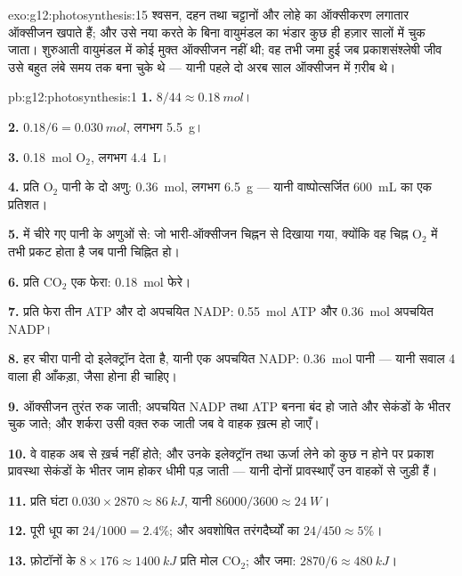 \begin{solution}{exo:g12:photosynthesis:15}
श्वसन, दहन तथा चट्टानों और लोहे का ऑक्सीकरण लगातार ऑक्सीजन खपाते हैं; और
उसे नया करते  के बिना वायुमंडल का भंडार कुछ ही हज़ार सालों में
चुक जाता। शुरुआती वायुमंडल में कोई मुक्त ऑक्सीजन नहीं थी; वह तभी जमा हुई जब
प्रकाशसंश्लेषी जीव उसे बहुत लंबे समय तक बना चुके थे --- यानी पहले दो अरब
साल ऑक्सीजन में ग़रीब थे।
\end{solution}

\begin{solution}{pb:g12:photosynthesis:1}
\textbf{1.} $8/44 \approx \qty{0.18}{mol}$।

\textbf{2.} $0.18/6 = \qty{0.030}{mol}$, लगभग \qty{5.5}{g}।

\textbf{3.} \qty{0.18}{mol} $\mathrm{O_2}$, लगभग \qty{4.4}{L}।

\textbf{4.} प्रति $\mathrm{O_2}$ पानी के दो अणु: \qty{0.36}{mol},
लगभग \qty{6.5}{g} --- यानी वाष्पोत्सर्जित \qty{600}{mL} का एक प्रतिशत।

\textbf{5.}  में चीरे गए पानी के अणुओं से: जो भारी-ऑक्सीजन
चिह्नन से दिखाया गया, क्योंकि वह चिह्न $\mathrm{O_2}$ में तभी प्रकट होता है
जब पानी चिह्नित हो।

\textbf{6.} प्रति $\mathrm{CO_2}$ एक फेरा: \qty{0.18}{mol} फेरे।

\textbf{7.} प्रति फेरा तीन ATP और दो अपचयित NADP: \qty{0.55}{mol}
ATP और \qty{0.36}{mol} अपचयित NADP।

\textbf{8.} हर चीरा पानी दो इलेक्ट्रॉन देता है, यानी एक अपचयित NADP:
\qty{0.36}{mol} पानी --- यानी सवाल 4 वाला ही आँकड़ा, जैसा होना ही
चाहिए।

\textbf{9.} ऑक्सीजन तुरंत रुक जाती; अपचयित NADP तथा ATP बनना बंद हो जाते और
सेकंडों के भीतर चुक जाते; और शर्करा उसी वक़्त रुक जाती जब वे वाहक ख़त्म हो
जाएँ।

\textbf{10.} वे वाहक अब  से ख़र्च नहीं होते; और उनके इलेक्ट्रॉन
तथा ऊर्जा लेने को कुछ न होने पर प्रकाश प्रावस्था सेकंडों के भीतर जाम होकर
धीमी पड़ जाती --- यानी दोनों प्रावस्थाएँ उन वाहकों से जुड़ी हैं।

\textbf{11.} प्रति घंटा $0.030 \times 2870 \approx \qty{86}{kJ}$, यानी
$86000/3600 \approx \qty{24}{W}$।

\textbf{12.} पूरी धूप का $24/1000 = 2.4\%$; और अवशोषित तरंगदैर्घ्यों का
$24/450 \approx
5\%$।

\textbf{13.} फ़ोटॉनों के $8 \times 176 \approx \qty{1400}{kJ}$ प्रति मोल
$\mathrm{CO_2}$; और जमा: $2870/6 \approx \qty{480}{kJ}$।


\end{solution}

